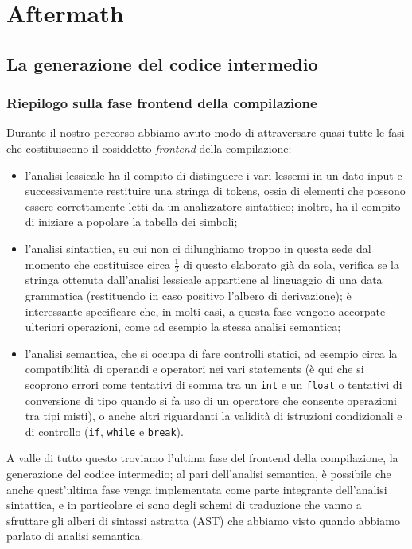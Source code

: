 \documentclass[class=book, crop=false, oneside, 12pt]{standalone}
\begin{document}
\part{Aftermath}
\chapter{La generazione del codice intermedio}
\section{Riepilogo sulla fase frontend della compilazione}
Durante il nostro percorso abbiamo avuto modo di attraversare quasi tutte le fasi che costituiscono il cosiddetto \emph{frontend} della compilazione:
\begin{itemize}
    \item l'analisi lessicale ha il compito di distinguere i vari lessemi in un dato input e successivamente restituire una stringa di tokens, ossia di elementi che possono essere correttamente letti da un analizzatore sintattico; inoltre, ha il compito di iniziare a popolare la tabella dei simboli;
    \item l'analisi sintattica, su cui non ci dilunghiamo troppo in questa sede dal momento che costituisce circa \(\frac{1}{3}\) di questo elaborato già da sola, verifica se la stringa ottenuta dall'analisi lessicale appartiene al linguaggio di una data grammatica (restituendo in caso positivo l'albero di derivazione); è interessante specificare che, in molti casi, a questa fase vengono accorpate ulteriori operazioni, come ad esempio la stessa analisi semantica;
    \item l'analisi semantica, che si occupa di fare controlli statici, ad esempio circa la compatibilità di operandi e operatori nei vari statements (è qui che si scoprono errori come tentativi di somma tra un \texttt{int} e un \texttt{float} o tentativi di conversione di tipo quando si fa uso di un operatore che consente operazioni tra tipi misti), o anche altri riguardanti la validità di istruzioni condizionali e di controllo (\texttt{if}, \texttt{while} e \texttt{break}).
\end{itemize}
A valle di tutto questo troviamo l'ultima fase del frontend della compilazione, la generazione del codice intermedio; al pari dell'analisi semantica, è possibile che anche quest'ultima fase venga implementata come parte integrante dell'analisi sintattica, e in particolare ci sono degli schemi di traduzione che vanno a sfruttare gli alberi di sintassi astratta (AST) che abbiamo visto quando abbiamo parlato di analisi semantica.
\end{document}
